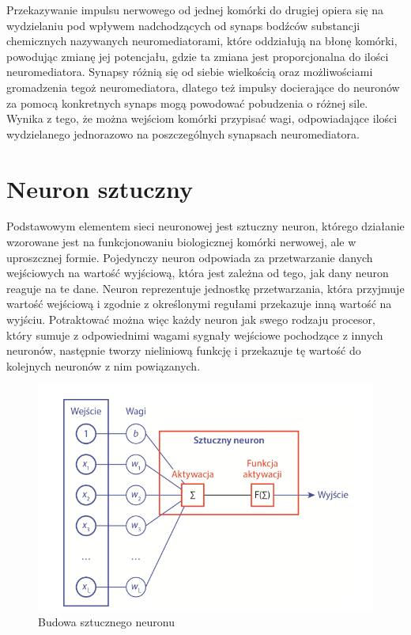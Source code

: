 \documentclass[a4paper, 12pt]{report}
\begin{document}
Przekazywanie impulsu nerwowego od jednej komórki do drugiej opiera się na wydzielaniu pod wpływem nadchodzących od synaps bodźców substancji chemicznych nazywanych neuromediatorami, które oddziałują na błonę komórki, powodując zmianę jej potencjału, gdzie ta zmiana jest proporcjonalna do ilości neuromediatora.
Synapsy różnią się od siebie wielkością oraz możliwościami gromadzenia tegoż neuromediatora, dlatego też impulsy docierające do neuronów za pomocą konkretnych synaps mogą powodować pobudzenia o różnej sile. Wynika z tego, że można wejściom komórki przypisać wagi, odpowiadające ilości wydzielanego jednorazowo na poszczególnych synapsach neuromediatora.\\


\section{Neuron sztuczny}
Podstawowym elementem sieci neuronowej jest sztuczny neuron, którego działanie wzorowane jest na funkcjonowaniu biologicznej komórki nerwowej, ale w uproszcznej formie. Pojedynczy neuron odpowiada za przetwarzanie danych wejściowych na wartość wyjściową, która jest zależna od tego, jak dany neuron reaguje na te dane. Neuron reprezentuje jednostkę przetwarzania, która przyjmuje wartość wejściową i zgodnie z określonymi regułami przekazuje inną wartość na wyjściu. Potraktować można więc każdy neuron jak  swego rodzaju procesor, który sumuje z odpowiednimi wagami sygnały wejściowe pochodzące z innych neuronów, następnie tworzy nieliniową funkcję i przekazuje tę wartość do kolejnych neuronów z nim powiązanych.

\begin{figure}[hbt!]
\includegraphics[width=12cm]{Neuron}
\centering
\caption{Budowa sztucznego neuronu\cite {book2}}
\end{figure}
\end{document}

